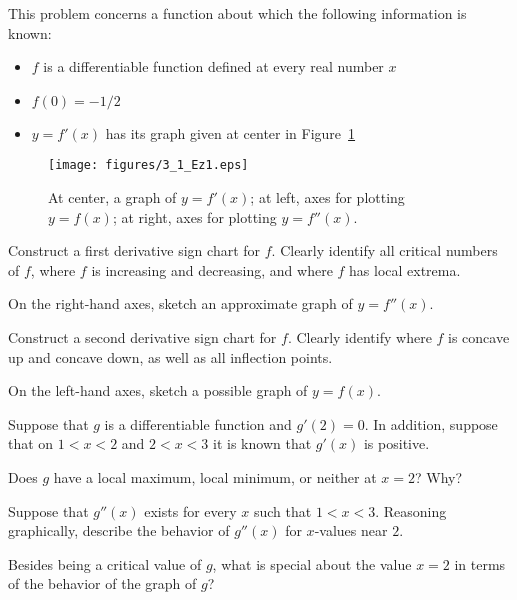 \begin{exercises} 
\item This problem concerns a function about which the following information is known:
\begin{itemize}
	\item $f$ is a differentiable function defined at every real number $x$
	\item $f(0) = -1/2$
	\item $y = f'(x)$ has its graph given at center in Figure~\ref{F:3.1.Ez1}
\end{itemize}
\begin{figure}[h]
\begin{center}
\texttt{[image: figures/3\_1\_Ez1.eps]}
\end{center}
\caption{At center, a graph of $y = f'(x)$; at left, axes for plotting $y = f(x)$; at right, axes for plotting $y = f''(x)$.} \label{F:3.1.Ez1}
\end{figure}
\ba
	\item Construct a first derivative sign chart for $f$.  Clearly identify all critical numbers of $f$, where $f$ is increasing and decreasing, and where $f$ has local extrema.
	\item On the right-hand axes, sketch an approximate graph of $y = f''(x)$.
	\item Construct a second derivative sign chart for $f$.  Clearly identify where $f$ is concave up and concave down, as well as all inflection points.
	\item On the left-hand axes, sketch a possible graph of $y = f(x)$.
\ea

\item Suppose that $g$ is a differentiable function and $g'(2) = 0$.  In addition, suppose that on $1 < x< 2$ and $2 < x < 3$ it is known that $g'(x)$ is positive.
\ba
	\item Does $g$ have a local maximum, local minimum, or neither at $x = 2$?  Why?
	\item Suppose that $g''(x)$ exists for every $x$ such that $1 < x < 3$.  Reasoning graphically, describe the behavior of $g''(x)$ for $x$-values near $2$.
	\item Besides being a critical value of $g$, what is special about the value $x = 2$ in terms of the behavior of the graph of $g$?
\ea


\end{exercises}
